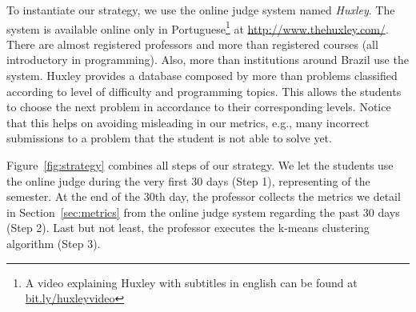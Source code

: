 To instantiate our strategy, we use the online judge system named \textit{Huxley}. The system is available online only in Portuguese\footnote{A video explaining Huxley with subtitles in english can be found at \url{bit.ly/huxleyvideo}} at \url{http://www.thehuxley.com/}. There are almost \huxleyProfessors registered professors and more than \huxleyCourses registered courses (all introductory in programming). Also, more than \huxleyInstitutions institutions around Brazil use the system. Huxley provides a database composed by more than \huxleyProblems problems classified according to level of difficulty and programming topics. This allows the students to choose the next problem in accordance to their corresponding levels. Notice that this helps on avoiding misleading in our metrics, e.g., many incorrect submissions to a problem that the student is not able to solve yet.





Figure~\ref{fig:strategy} combines all steps of our strategy. We let the students use the online judge during the very first 30 days (Step 1), representing \semesterPercentage of the semester. At the end of the 30th day, the professor collects the metrics we detail in Section~\ref{sec:metrics} from the online judge system regarding the past 30 days (Step 2). Last but not least, the professor executes the k-means clustering algorithm (Step 3).


